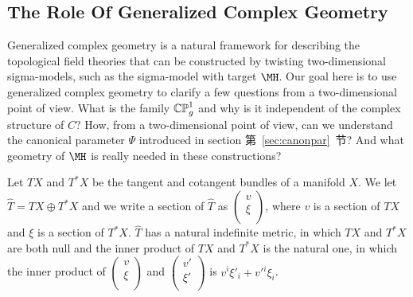 
\subsection{The Role Of Generalized Complex Geometry}

\label{sec:gencpx}

Generalized complex geometry is a natural framework for describing
the topological field theories that can be constructed by twisting
two-dimensional sigma-models, such as the sigma-model with target
$\MH$.  Our goal here is to use generalized complex geometry to
clarify a few questions from a two-dimensional point of view. What
is the family $\Bbb{CP}^1_g$ and why is it independent of the
complex structure of $C$?  How, from a two-dimensional point of
view, can we understand the canonical parameter $\Psi$ introduced
in section 第~\ref{sec:canonpar}~节?   And what geometry of $\MH$ is really
needed in these constructions?

 Let $TX$ and $T^*X$ be the tangent
and cotangent bundles of a manifold $X$. We let $\hat T=TX\oplus
T^*X$ and we write a section of $\hat T$ as $\left(\begin{matrix}v\\
\xi\\\end{matrix}\right)$, where $v$ is a section of $TX$ and $\xi$ is a
section of $T^*X$.  $\hat T$ has a natural indefinite metric, in
which $TX$ and $T^*X$ are both null and the inner product of $TX$
and $T^*X$ is the natural one, in which the inner product  of
$\left(\begin{matrix}v\\ \xi\\\end{matrix}\right)$ and $\left(\begin{matrix}v'\\
\xi'\\\end{matrix}\right)$ is $v^i\xi'_i+v'{}^i\xi_i$.

  
 

